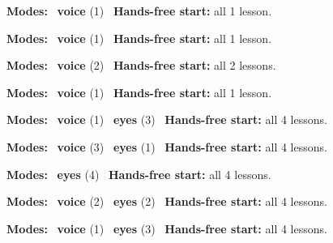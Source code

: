 \expandafter\def\csname hlchaptermodality30\endcsname{%
  {\small\noindent
    \textbf{Modes:} \hlvoicesign{}~\textbf{voice} (1)\quad
    \hlvoicesign{}~\textbf{Hands-free start:} all 1 lesson.%
    \par}\medskip
}

\expandafter\def\csname hlchaptermodality31\endcsname{%
  {\small\noindent
    \textbf{Modes:} \hlvoicesign{}~\textbf{voice} (1)\quad
    \hlvoicesign{}~\textbf{Hands-free start:} all 1 lesson.%
    \par}\medskip
}

\expandafter\def\csname hlchaptermodality32\endcsname{%
  {\small\noindent
    \textbf{Modes:} \hlvoicesign{}~\textbf{voice} (2)\quad
    \hlvoicesign{}~\textbf{Hands-free start:} all 2 lessons.%
    \par}\medskip
}

\expandafter\def\csname hlchaptermodality33\endcsname{%
  {\small\noindent
    \textbf{Modes:} \hlvoicesign{}~\textbf{voice} (1)\quad
    \hlvoicesign{}~\textbf{Hands-free start:} all 1 lesson.%
    \par}\medskip
}

\expandafter\def\csname hlchaptermodality34\endcsname{%
  {\small\noindent
    \textbf{Modes:} \hlvoicesign{}~\textbf{voice} (1) \quad \hlsightsign{}~\textbf{eyes} (3)\quad
    \hlvoicesign{}~\textbf{Hands-free start:} all 4 lessons.%
    \par}\medskip
}

\expandafter\def\csname hlchaptermodality35\endcsname{%
  {\small\noindent
    \textbf{Modes:} \hlvoicesign{}~\textbf{voice} (3) \quad \hlsightsign{}~\textbf{eyes} (1)\quad
    \hlvoicesign{}~\textbf{Hands-free start:} all 4 lessons.%
    \par}\medskip
}

\expandafter\def\csname hlchaptermodality36\endcsname{%
  {\small\noindent
    \textbf{Modes:} \hlsightsign{}~\textbf{eyes} (4)\quad
    \hlvoicesign{}~\textbf{Hands-free start:} all 4 lessons.%
    \par}\medskip
}

\expandafter\def\csname hlchaptermodality37\endcsname{%
  {\small\noindent
    \textbf{Modes:} \hlvoicesign{}~\textbf{voice} (2) \quad \hlsightsign{}~\textbf{eyes} (2)\quad
    \hlvoicesign{}~\textbf{Hands-free start:} all 4 lessons.%
    \par}\medskip
}

\expandafter\def\csname hlchaptermodality38\endcsname{%
  {\small\noindent
    \textbf{Modes:} \hlvoicesign{}~\textbf{voice} (1) \quad \hlsightsign{}~\textbf{eyes} (3)\quad
    \hlvoicesign{}~\textbf{Hands-free start:} all 4 lessons.%
    \par}\medskip
}

